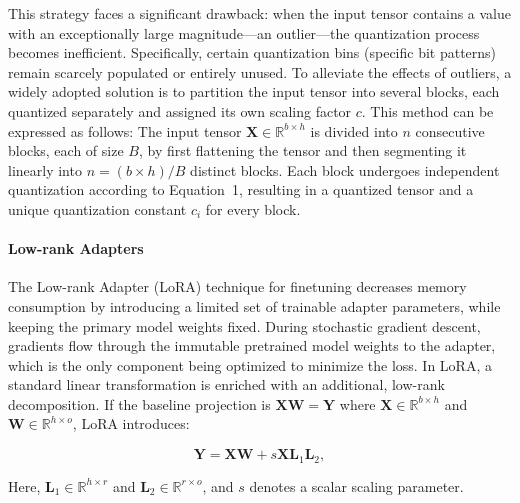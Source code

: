 This strategy faces a significant drawback: when the input tensor contains a value with an exceptionally large magnitude—an outlier—the quantization process becomes inefficient. Specifically, certain quantization bins (specific bit patterns) remain scarcely populated or entirely unused. To alleviate the effects of outliers, a widely adopted solution is to partition the input tensor into several blocks, each quantized separately and assigned its own scaling factor $c$. This method can be expressed as follows: The input tensor $\mathbf{X}\in \mathbb{R}^{b\times h}$ is divided into $n$ consecutive blocks, each of size $B$, by first flattening the tensor and then segmenting it linearly into $n = ({b\times h})/{B}$ distinct blocks. Each block undergoes independent quantization according to Equation~1, resulting in a quantized tensor and a unique quantization constant $c_i$ for every block.

\paragraph{Low-rank Adapters} The Low-rank Adapter (LoRA) technique for finetuning \citep{hu2021lora} decreases memory consumption by introducing a limited set of trainable adapter parameters, while keeping the primary model weights fixed. During stochastic gradient descent, gradients flow through the immutable pretrained model weights to the adapter, which is the only component being optimized to minimize the loss. In LoRA, a standard linear transformation is enriched with an additional, low-rank decomposition. If the baseline projection is ${\mathbf{X} \mathbf{W} = \mathbf{Y}}$ where $\mathbf{X}\in  \mathbb{R}^{b\times h}$ and $\mathbf{W}\in  \mathbb{R}^{h\times o}$, LoRA introduces:

\begin{equation}
    \mathbf{Y} = \mathbf{X}\mathbf{W} + s\mathbf{X}\mathbf{L}_1\mathbf{L}_2,
\end{equation}

Here, $\mathbf{L}_1\in  \mathbb{R}^{h\times r}$ and $\mathbf{L}_2\in  \mathbb{R}^{r\times o}$, and $s$ denotes a scalar scaling parameter.

